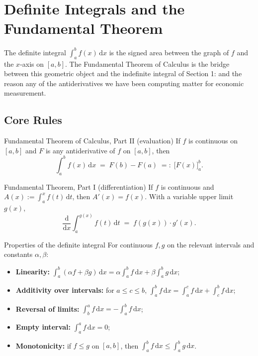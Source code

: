 \chapter{Definite Integrals and the Fundamental Theorem}

The definite integral $\int_a^b f(x)\,\mathrm{d}x$ is the signed area
between the graph of $f$ and the $x$-axis on $[a,b]$. The Fundamental
Theorem of Calculus is the bridge between this
geometric object and the indefinite integral of Section 1: and the
reason any of the antiderivatives we have been computing matter for
economic measurement.

\section{Core Rules}

\begin{rulebox}{Fundamental Theorem of Calculus, Part II (evaluation)}
If $f$ is continuous on $[a,b]$ and $F$ is any antiderivative of $f$ on
$[a,b]$, then
\[
  \int_{a}^{b} f(x)\,\mathrm{d}x \;=\; F(b)-F(a) \;=:\; \bigl[F(x)\bigr]_{a}^{b} .
\]
\end{rulebox}

\begin{rulebox}{Fundamental Theorem, Part I (differentiation)}
If $f$ is continuous and $A(x):=\int_{a}^{x} f(t)\,\mathrm{d}t$, then
$A'(x)=f(x)$. With a variable upper limit $g(x)$,
\[
  \frac{\mathrm{d}}{\mathrm{d}x}\int_{a}^{g(x)} f(t)\,\mathrm{d}t
    \;=\; f(g(x))\cdot g'(x) .
\]
\end{rulebox}

\begin{rulebox}{Properties of the definite integral}
For continuous $f,g$ on the relevant intervals and constants $\alpha,\beta$:
\begin{itemize}[leftmargin=1.6em,itemsep=0.3ex]
  \item \textbf{Linearity:}
        $\displaystyle\int_{a}^{b}(\alpha f+\beta g)\,\mathrm{d}x
          =\alpha\int_{a}^{b} f\,\mathrm{d}x+\beta\int_{a}^{b} g\,\mathrm{d}x$;
  \item \textbf{Additivity over intervals:} for $a\le c\le b$,
        $\displaystyle\int_{a}^{b} f\,\mathrm{d}x
          =\int_{a}^{c} f\,\mathrm{d}x+\int_{c}^{b} f\,\mathrm{d}x$;
  \item \textbf{Reversal of limits:}
        $\displaystyle\int_{b}^{a} f\,\mathrm{d}x=-\int_{a}^{b} f\,\mathrm{d}x$;
  \item \textbf{Empty interval:}
        $\displaystyle\int_{a}^{a} f\,\mathrm{d}x=0$;
  \item \textbf{Monotonicity:} if $f\le g$ on $[a,b]$, then
        $\displaystyle\int_{a}^{b} f\,\mathrm{d}x\le\int_{a}^{b} g\,\mathrm{d}x$.
\end{itemize}
\end{rulebox}


